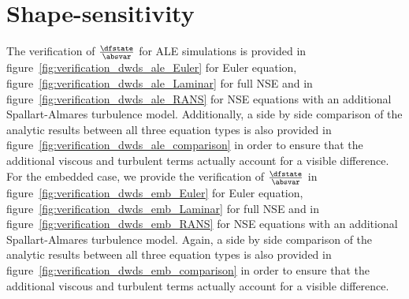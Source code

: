 \documentclass[../main.tex]{subfiles}
\begin{document}
\FloatBarrier



\section{Shape-sensitivity}
The verification of $\tfrac{\dfstate}{\absvar}$ for ALE simulations is provided in figure~\ref{fig:verification_dwds_ale_Euler} for Euler equation, figure~\ref{fig:verification_dwds_ale_Laminar} for full \ac{NSE} and in figure~\ref{fig:verification_dwds_ale_RANS} for \ac{NSE} equations with an additional Spallart-Almares turbulence model.
Additionally, a side by side comparison of the analytic results between all three equation types is also provided in figure~\ref{fig:verification_dwds_ale_comparison} in order to ensure that the additional viscous and turbulent terms actually account for a visible difference.
\\
For the embedded case, we provide the verification of $\tfrac{\dfstate}{\absvar}$  in figure~\ref{fig:verification_dwds_emb_Euler} for Euler equation, figure~\ref{fig:verification_dwds_emb_Laminar} for full \ac{NSE} and in figure~\ref{fig:verification_dwds_emb_RANS} for \ac{NSE} equations with an additional Spallart-Almares turbulence model.
Again, a side by side comparison of the analytic results between all three equation types is also provided in figure~\ref{fig:verification_dwds_emb_comparison} in order to ensure that the additional viscous and turbulent terms actually account for a visible difference.
\end{document}
